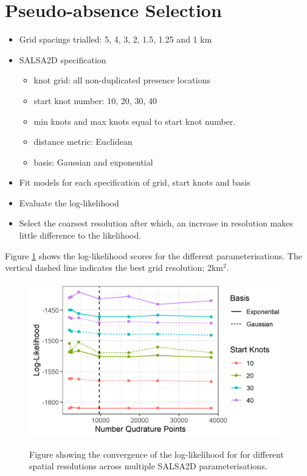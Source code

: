 \section{Pseudo-absence Selection}

\begin{itemize}
    \item Grid spacings trialled: 5, 4, 3, 2, 1.5, 1.25 and 1 km
    \item SALSA2D specification
    \begin{itemize}
        \item knot grid: all non-duplicated presence locations
        \item start knot number: 10, 20, 30, 40
        \item min knots and max knots equal to start knot number. 
        \item distance metric: Euclidean
        \item basis: Gaussian and exponential
    \end{itemize}
    \item Fit models for each specification of grid, start knots and basis
    \item Evaluate the log-likelihood
    \item Select the coarsest resolution after which, an increase in resolution makes little difference to the likelihood. 
\end{itemize}

Figure \ref{fig:resolutionconvergence} shows the log-likelihood scores for the different parameterisations. The vertical dashed line indicates the best grid resolution; 2km$^2$.

\begin{figure}[!htb]
\centering
\caption{Figure showing the convergence of the log-likelihood for for different spatial resolutions across multiple SALSA2D parameterisations.}
\includegraphics[width=0.9\linewidth]{suppimages/ppconverge.png}
\label{fig:resolutionconvergence}
\end{figure}

